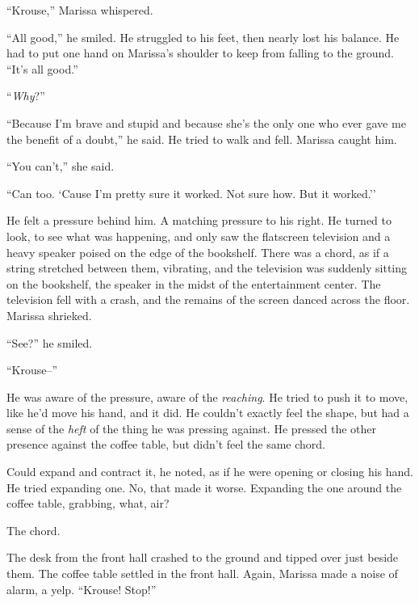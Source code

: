 ``Krouse,'' Marissa whispered.



``All good,'' he smiled.  He struggled to his feet, then nearly lost his balance.  He had to put one hand on Marissa's shoulder to keep from falling to the ground.  ``It's all good.''



``\emph{Why}?''



``Because I'm brave and stupid and because she's the only one who ever gave me the benefit of a doubt,'' he said.  He tried to walk and fell.  Marissa caught him.



``You can't,'' she said.



``Can too.  `Cause I'm pretty sure it worked.  Not sure how.  But it worked.''



He felt a pressure behind him.  A matching pressure to his right.  He turned to look, to see what was happening, and only saw the flatscreen television and a heavy speaker poised on the edge of the bookshelf.  There was a chord, as if a string stretched between them, vibrating, and the television was suddenly sitting on the bookshelf, the speaker in the midst of the entertainment center.  The television fell with a crash, and the remains of the screen danced across the floor.  Marissa shrieked.



``See?'' he smiled.



``Krouse--''



He was aware of the pressure, aware of the \emph{reaching}.  He tried to push it to move, like he'd move his hand, and it did.  He couldn't exactly feel the shape, but had a sense of the \emph{heft} of the thing he was pressing against.  He pressed the other presence against the coffee table, but didn't feel the same chord.



Could expand and contract it, he noted, as if he were opening or closing his hand.  He tried expanding one.  No, that made it worse.  Expanding the one around the coffee table, grabbing, what, air?



The chord.



The desk from the front hall crashed to the ground and tipped over just beside them.  The coffee table settled in the front hall.  Again, Marissa made a noise of alarm, a yelp.  ``Krouse!  Stop!''



